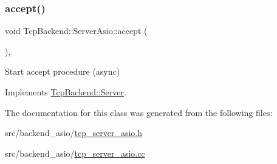 \subsubsection{\texorpdfstring{accept()}{accept()}}
{\footnotesize\ttfamily void Tcp\+Backend\+::\+Server\+Asio\+::accept (\begin{DoxyParamCaption}{ }\end{DoxyParamCaption})\hspace{0.3cm}{\ttfamily [override]}, {\ttfamily [virtual]}}



Start accept procedure (async) 



Implements \hyperlink{classTcpBackend_1_1Server_aab685a052c45a25ecc9a30ec14bf91e9}{Tcp\+Backend\+::\+Server}.



The documentation for this class was generated from the following files\+:\begin{DoxyCompactItemize}
\item 
src/backend\+\_\+asio/\hyperlink{tcp__server__asio_8h}{tcp\+\_\+server\+\_\+asio.\+h}\item 
src/backend\+\_\+asio/\hyperlink{tcp__server__asio_8cc}{tcp\+\_\+server\+\_\+asio.\+cc}\end{DoxyCompactItemize}
